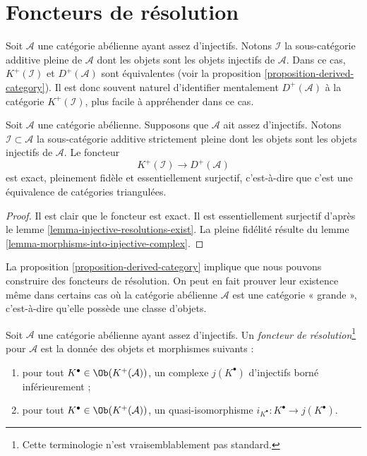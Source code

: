 \section{Foncteurs de résolution}
\label{section-derived-category}

\noindent
Soit $\mathcal{A}$ une catégorie abélienne ayant assez d'injectifs.
Notons $\mathcal{I}$ la sous-catégorie additive pleine de $\mathcal{A}$ dont
les objets sont les objets injectifs de $\mathcal{A}$.
Dans ce cas, $K^{+}(\mathcal{I})$ et $D^{+}(\mathcal{A})$ sont équivalentes
(voir la proposition \ref{proposition-derived-category}).
Il est donc souvent naturel d'identifier mentalement $D^{+}(\mathcal{A})$ à
la catégorie $K^{+}(\mathcal{I})$, plus facile à appréhender dans ce cas.

\begin{proposition}
\label{proposition-derived-category}
Soit $\mathcal{A}$ une catégorie abélienne.
Supposons que $\mathcal{A}$ ait assez d'injectifs.
Notons $\mathcal{I} \subset \mathcal{A}$ la sous-catégorie additive
strictement pleine dont les objets sont les objets injectifs de
$\mathcal{A}$. Le foncteur
$$
K^{+}(\mathcal{I}) \longrightarrow D^{+}(\mathcal{A})
$$
est exact, pleinement fidèle et essentiellement surjectif, c'est-à-dire que
c'est une équivalence de catégories triangulées.
\end{proposition}

\begin{proof}
Il est clair que le foncteur est exact. Il est essentiellement surjectif
d'après le lemme \ref{lemma-injective-resolutions-exist}.
La pleine fidélité résulte du
lemme \ref{lemma-morphisms-into-injective-complex}.
\end{proof}

\noindent
La proposition \ref{proposition-derived-category} implique que nous pouvons
construire des foncteurs de résolution. On peut en fait prouver leur existence
même dans certains cas où la catégorie abélienne $\mathcal{A}$ est une
catégorie « grande », c'est-à-dire qu'elle possède une classe d'objets.

\begin{definition}
\label{definition-localization-functor}
Soit $\mathcal{A}$ une catégorie abélienne ayant assez d'injectifs.
Un {\it foncteur de résolution}\footnote{Cette terminologie n'est
vraisemblablement pas standard.} pour $\mathcal{A}$ est la donnée des objets
et morphismes suivants :
\begin{enumerate}
\item pour tout $K^\bullet \in \Ob(K^{+}(\mathcal{A}))$, un complexe
$j(K^\bullet)$ d'injectifs borné inférieurement ;
\item pour tout $K^\bullet \in \Ob(K^{+}(\mathcal{A}))$, un
quasi-isomorphisme $i_{K^\bullet} : K^\bullet \to j(K^\bullet)$.
\end{enumerate}
\end{definition}

